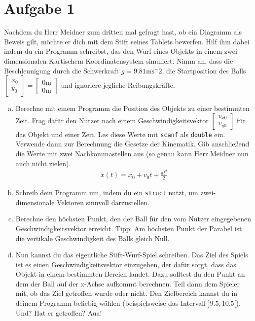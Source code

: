 \documentclass{standalone}
\begin{document}
\section{Aufgabe 1}
    Nachdem du Herr Meidner zum dritten mal gefragt hast, ob ein Diagramm als Beweis gilt, möchte er dich mit dem Stift seines Tablets bewerfen. Hilf ihm dabei indem du ein Programm schreibst, das den Wurf eines Objekts in einem zwei-dimensionalen Kartischem Koordinatensystem simuliert. Nimm an, dass die Beschleunigung durch die Schwerkraft $g=9.81\text{ms}^-2$, die Startposition des Balls $\begin{bmatrix}x_0\\y_0\end{bmatrix}=\begin{bmatrix}0\text{m}\\0\text{m}\end{bmatrix}$ und ignoriere jegliche Reibungskräfte.

\begin{enumerate}[a)]
\item
    Berechne mit einem Programm die Position des Objekts zu einer bestimmten Zeit. Frag  dafür den Nutzer nach einem Geschwindigkeitsvektor $\begin{bmatrix}v_{x0}\\v_{y0}\end{bmatrix}$ für das Objekt und einer Zeit. Les diese Werte mit \texttt{scanf} als \texttt{double} ein. Verwende dann zur Berechnung die Gesetze der Kinematik. Gib anschließend die Werte mit zwei Nachkommastellen aus (so genau kann Herr Meidner nun auch nicht zielen).
    \begin{align*}
        x(t)=x_0+v_0t+\frac{at^2}{2}
    \end{align*}

\item
    Schreib dein Programm um, indem du ein \texttt{struct} nutzt, um zwei-dimensionale Vektoren sinnvoll darzustellen.

\item
    Berechne den höchsten Punkt, den der Ball für den vom Nutzer eingegebenen Geschwindigkeitsvektor erreicht. Tipp: Am höchsten Punkt der Parabel ist die vertikale Geschwindigkeit des Balls gleich Null.

\item
    Nun kannst du das eigentliche Stift-Wurf-Spiel schreiben. Das Ziel des Spiels ist es einen Geschwindigkeitsvektor einzugeben, der dafür sorgt, dass das Objekt in einem bestimmten Bereich landet. Dazu solltest du den Punkt an dem der Ball auf der x-Achse aufkommt berechnen. Teil dann dem Spieler mit, ob das Ziel getroffen wurde oder nicht. Den Zielbereich kannst du in deinem Programm beliebig wählen (beispielsweise das Intervall $]9.5,10.5[$). Und? Hat er getroffen? Aua!

\end{enumerate}
\end{document}
